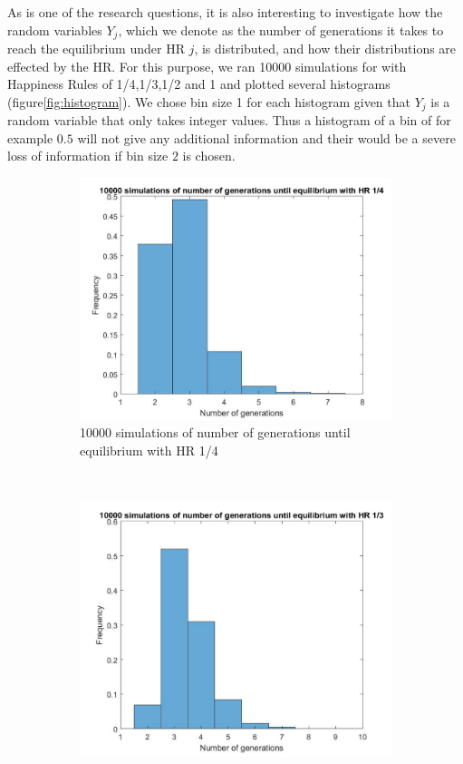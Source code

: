 As is one of the research questions, it is also interesting to investigate how the random variables $Y_j$, which we denote as the number of generations it takes to reach the equilibrium under HR $j$, is distributed, and how their distributions are effected by the HR. 
For this purpose, we ran 10000 simulations for with Happiness Rules of 1/4,1/3,1/2 and 1 and plotted several histograms (figure\ref{fig:histogram}). 
We chose bin size 1 for each histogram given that $Y_j$ is a random variable that only takes integer values. 
Thus a histogram of a bin of for example $0.5$ will not give any additional information and their would be a severe loss of information if bin size $2$ is chosen. 

\begin{figure}[H]
    \centering
    \begin{subfigure}{0.45\textwidth}
        \includegraphics[width=\textwidth]{GenormHistogramAantalgen4.pdf}
        \caption{10000 simulations of number of generations until equilibrium with HR 1/4}
        \label{hist hap 1/4}
    \end{subfigure}
	~
    \begin{subfigure}{0.45\textwidth}
        \includegraphics[width=\textwidth]{GenormHistogramAantalgen.pdf}

\end{subfigure}
\end{figure}
